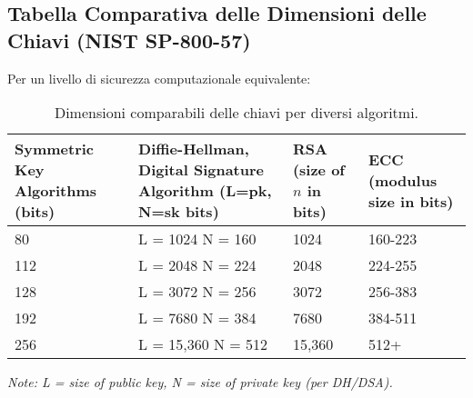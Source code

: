 \subsection{Tabella Comparativa delle Dimensioni delle Chiavi (NIST SP-800-57)}
Per un livello di sicurezza computazionale equivalente:
\begin{table}[H]
    \centering
    \renewcommand{\arraystretch}{1.2} %
    \begin{tabular}{|p{2.5cm}|p{3.5cm}|p{2.5cm}|p{2.5cm}|}
        \hline
        \textbf{\sffamily Symmetric Key Algorithms (bits)} & \textbf{\sffamily Diffie-Hellman, Digital Signature Algorithm (L=pk, N=sk bits)} & \textbf{\sffamily RSA (size of $n$ in bits)} & \textbf{\sffamily ECC (modulus size in bits)} \\ \hline \hline
        80  & L = 1024 \newline N = 160 & 1024  & 160-223 \\ \hline
        112 & L = 2048 \newline N = 224 & 2048  & 224-255 \\ \hline
        128 & L = 3072 \newline N = 256 & 3072  & 256-383 \\ \hline
        192 & L = 7680 \newline N = 384 & 7680  & 384-511 \\ \hline
        256 & L = 15,360 \newline N = 512 & 15,360 & 512+    \\ \hline
    \end{tabular}
    \caption{Dimensioni comparabili delle chiavi per diversi algoritmi.}
    \label{tab:key_sizes_comparison}
    \small\textit{Note: L = size of public key, N = size of private key (per DH/DSA).}
\end{table}

